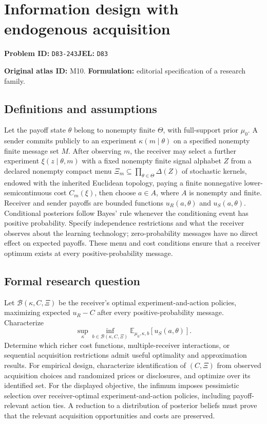\documentclass[11pt,a4paper]{article}
\begin{document}
\section*{Information design with endogenous acquisition}
\textbf{Problem ID:} \texttt{D83-243}\quad \textbf{JEL:} \texttt{D83}\par
\label{problem:OP-0010}
\label{atlas:prob:M10}

\noindent\textbf{Original atlas ID:} M10. \textbf{Formulation:} editorial specification of a research family.

\subsection*{Definitions and assumptions}

Let the payoff state $\theta$ belong to nonempty finite $\Theta$, with full-support prior $\mu_0$. A sender commits publicly to an experiment $\kappa(m\mid\theta)$ on a specified nonempty finite message set $M$. After observing $m$, the receiver may select a further experiment $\xi(z\mid\theta,m)$ with a fixed nonempty finite signal alphabet $Z$ from a declared nonempty compact menu $\Xi_m\subseteq\prod_{\theta\in\Theta}\Delta(Z)$ of stochastic kernels, endowed with the inherited Euclidean topology, paying a finite nonnegative lower-semicontinuous cost $C_m(\xi)$, then choose $a\in A$, where $A$ is nonempty and finite. Receiver and sender payoffs are bounded functions $u_R(a,\theta)$ and $u_S(a,\theta)$. Conditional posteriors follow Bayes' rule whenever the conditioning event has positive probability. Specify independence restrictions and what the receiver observes about the learning technology; zero-probability messages have no direct effect on expected payoffs. These menu and cost conditions ensure that a receiver optimum exists at every positive-probability message.

\subsection*{Formal research question}

Let $\mathcal B(\kappa,C,\Xi)$ be the receiver's optimal experiment-and-action policies, maximizing expected $u_R-C$ after every positive-probability message. Characterize
\[
\sup_\kappa\inf_{b\in\mathcal B(\kappa,C,\Xi)}
 \mathbb E_{\mu_0,\kappa,b}[u_S(a,\theta)].
\]
Determine which richer cost functions, multiple-receiver interactions, or sequential acquisition restrictions admit useful optimality and approximation results. For empirical design, characterize identification of $(C,\Xi)$ from observed acquisition choices and randomized prices or disclosures, and optimize over its identified set. For the displayed objective, the infimum imposes pessimistic selection over receiver-optimal experiment-and-action policies, including payoff-relevant action ties. A reduction to a distribution of posterior beliefs must prove that the relevant acquisition opportunities and costs are preserved.
\end{document}
